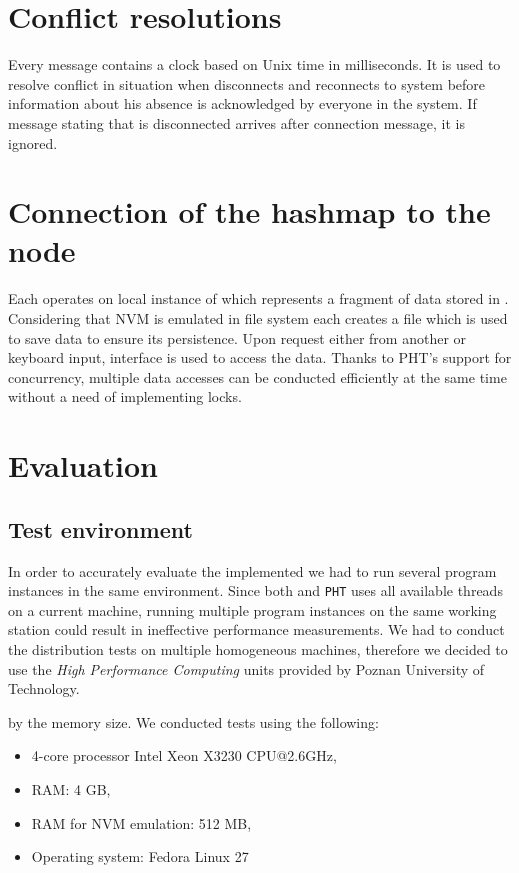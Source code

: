 \section{Conflict resolutions}
    Every message contains a clock based on Unix time in milliseconds.
    It is used to resolve conflict in situation when \Node disconnects and reconnects to system before information about his absence is acknowledged by everyone in the system.
    If message stating that \Node is disconnected arrives after connection message, it is ignored.

\section{Connection of the hashmap to the node}
    Each \Node operates on local instance of \PHT which represents a fragment of data stored in \DHTS.
    Considering that NVM is emulated in file system each \Node creates a file which is used to save data to ensure its persistence.
    Upon request either from another \Node or keyboard input, \PHT interface is used to access the data.
    Thanks to PHT's support for concurrency, multiple data accesses can be conducted efficiently at the same time without a need of implementing locks.

\section{Evaluation}

    \subsection{Test environment}
        In order to accurately evaluate the implemented \DHTS we had to run several program instances in the same environment.
        Since both \Node and \texttt{PHT} uses all available threads on a current machine, running multiple program instances on the same working station could result in ineffective performance measurements.
        We had to conduct the distribution tests on multiple homogeneous machines, therefore we decided to use the \textit{High Performance Computing} units provided by Poznan University of Technology. 
        
        by the memory size. We conducted tests using the following:
    \begin{itemize}
        \item 4-core processor Intel Xeon X3230 CPU@2.6GHz, %
        \item RAM: 4 GB,
        \item RAM for NVM emulation: 512 MB,
        \item Operating system: Fedora Linux 27
    \end{itemize}
    
